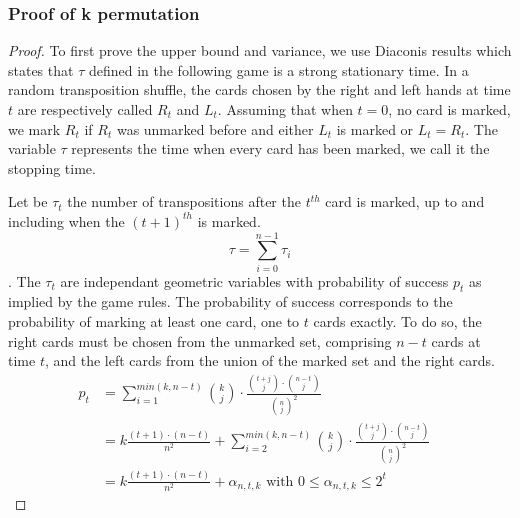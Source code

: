 \documentclass[conference]{IEEEtran}
\begin{document}
\subsubsection{Proof of k permutation}
\begin{proof}
To first prove the upper bound and variance, we use Diaconis\cite{} results which states that $\tau$ defined in the following game is a strong stationary time.
In a random transposition shuffle, the cards chosen by the right and left hands at time $t$ are respectively called $R_t$ and $L_t$. Assuming that when $t=0$, no card is marked, we mark $R_t$ if
$R_t$ was unmarked before and either $L_t$ is marked or $L_t = R_t$. The variable $\tau$ represents the time when every card has been marked, we call it the stopping time.

Let be $\tau_t$ the number of transpositions after the $t^{th}$ card is marked, up to and including when the $(t+1)^{th}$ is marked. $$\tau = \sum_{i=0}^{n-1} \tau_i$$.
The $\tau_t$ are independant geometric variables with probability of success $p_t$ as implied by the game rules.
The probability of success corresponds to the probability of marking at least one card, one to $t$ cards exactly. To do so, the right cards must be chosen from the unmarked set, comprising $n-t$ cards at time $t$,
and the left cards from the union of the marked set and the right cards.
\begin{align*}
 p_t &= \sum_{i=1}^{min(k,n-t)} {k \choose j} \cdot \frac{ {t+j \choose j} \cdot {n-t \choose j} }{ {n \choose j}^2 }&\\
 &= k \frac{(t+1)\cdot(n-t)}{n^2} + \sum_{i=2}^{min(k,n-t)} {k \choose j} \cdot \frac{ {t+j \choose j} \cdot {n-t \choose j} }{ {n \choose j}^2 }&\\
 &= k \frac{(t+1)\cdot(n-t)}{n^2} + \alpha_{n,t,k} \text{ with } 0 \leq \alpha_{n,t,k} \leq 2^t
\end{align*}


\end{proof}
\end{document}
